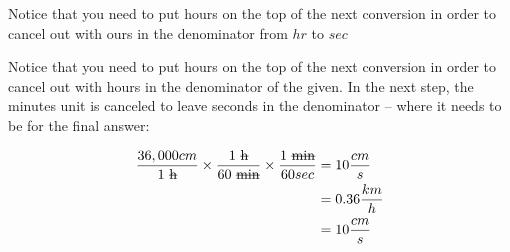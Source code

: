 \begin{example}
  Notice that you need to put hours on the top of the next conversion in order
  to cancel out with ours in the denominator from $hr$ to $sec$

  Notice that you need to put hours on the top of the next conversion in order
  to cancel out with hours in the denominator of the given. In the next step,
  the minutes unit is canceled to leave seconds in the denominator -- where it
  needs to be for the final answer:

  \begin{align}
    \frac{36,000 cm}{1 \rm{ \sout{h}}} \times \frac{1 \rm{ \sout{h}}}{60 \rm{ \sout{min}}} \times \frac{1 \rm{ \sout{min}}}{60 sec} &= 10 \frac{cm}{s} \\
                                                                                                                                    &= 0.36 \frac{km}{h} \\
                                                                                                                                    &= 10 \frac{cm}{s}
  \end{align}
\end{example}

